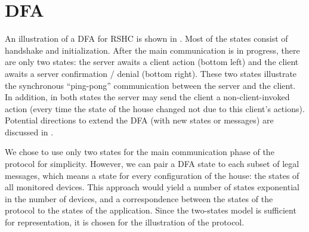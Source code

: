 \section{DFA}
\label{sec:dfa}

An illustration of a DFA for RSHC is shown in . Most of the states consist of handshake and initialization. After the main communication is in progress, there are only two states: the server awaits a client action (bottom left) and the client awaits a server confirmation / denial (bottom right). These two states illustrate the synchronous ``ping-pong'' communication between the server and the client. In addition, in both states the server may send the client a non-client-invoked action (every time the state of the house changed not due to this client's actions). Potential directions to extend the DFA (with new states or messages) are discussed in .

We chose to use only two states for the main communication phase of the protocol for simplicity. However, we can pair a DFA state to each subset of legal messages, which means a state for every configuration of the house: the states of all monitored devices. This approach would yield a number of states exponential in the number of devices, and a correspondence between the states of the protocol to the states of the application. Since the two-states model is sufficient for representation, it is chosen for the illustration of the protocol.
